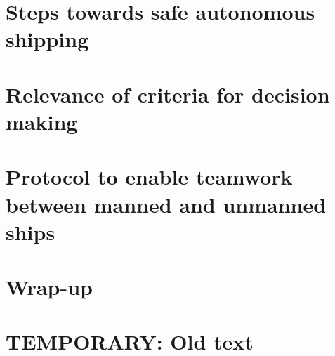 \documentclass[a4paper,11pt,oneside]{book}
\begin{document}
\frontmatter


\makeCover %

\listoftodos[Notes]
\clearpage





\clearpage
\setcounter{tocdepth}{1}
\tableofcontents
\clearpage

\mainmatter



\part{Steps towards safe autonomous shipping}






\part{Relevance of criteria for decision making}
\label{part:MT}









\part{Protocol to enable teamwork between manned and unmanned ships}
\label{part:CS}





\part{Wrap-up}



\backmatter

\part{TEMPORARY: Old text}





\end{document}
